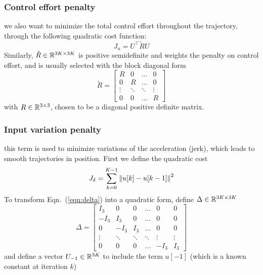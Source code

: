 \subsubsection{Control effort penalty}
we also want to minimize the total control effort throughout the trajectory, through the following quadratic cost function:
\begin{equation}
\label{eqn:input}
J_u = U^\top \tilde{R} U 
\end{equation}
Similarly, $\tilde{R} \in {\mathbb R}^{3K \times 3K} $ is positive semidefinite and weights the penalty on control effort, and is usually selected with the block diagonal form
\begin{equation}
\tilde{R} = \begin{bmatrix}
R & 0& \ldots & 0 \\
0 & R & \ldots & 0 \\
\vdots & \ddots & \ddots & \vdots \\
0 & 0 & \ldots & R
\end{bmatrix}
\end{equation}
with $R \in {\mathbb R}^{3 \times 3}$, chosen to be a diagonal positive definite matrix.

\subsubsection{Input variation penalty}
this term is used to minimize variations of the acceleration (jerk), which leads to smooth trajectories in position. First we define the quadratic cost
\begin{equation}
\label{eqn:delta}
J_\delta = \sum_{k=0}^{K-1}\left\Vert u[k]-u[k-1]\right\Vert^2
\end{equation}
To transform Eqn.~(\ref{eqn:delta}) into a quadratic form, define $\Delta \in {\mathbb R}^{3K \times 3K}$
\begin{equation}
\Delta = \begin{bmatrix}
I_3 & 0 & 0 & \ldots & 0 & 0 \\
-I_3 & I_3 & 0 & \dots & 0 & 0 \\
0 & -I_3 & I_3 & \ldots & 0 & 0 \\
\vdots & \ddots & \ddots & \ddots & \vdots & \vdots\\
0& 0 & 0 & \ldots & -I_3 & I_3
\end{bmatrix}
\end{equation}
and define a vector $U_{-1} \in {\mathbb R}^{3K}$ to include the term $u[-1]$ (which is a known constant at iteration $k$)

